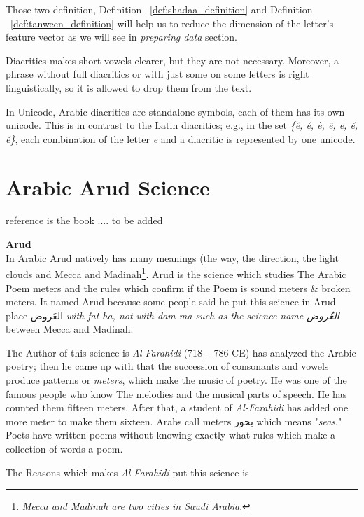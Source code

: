 Those two definition, Definition ~\ref{def:shadaa_definition} and Definition ~\ref{def:tanween_definition}  will help us to reduce the dimension of the letter's feature vector as we will see in \textit{preparing data} section.


Diacritics makes short vowels clearer, but they are not necessary.
Moreover, a phrase without full diacritics or with just some on some letters is
right linguistically, so it is allowed to drop them from the text.

In Unicode, Arabic diacritics are standalone symbols, each of them has its own
unicode. This is in contrast to the Latin diacritics; e.g., in the set
\textit{\{ê, é, è, ë, ē, ĕ, ě\}}, each combination of the letter \textit{e} and a diacritic is represented by one unicode.

\newpage

\section{Arabic Arud Science}
reference is the book .... to be added
\begin{definition}\label{def:arud}
  \textbf{Arud} \hfill \\
In Arabic Arud natively has many meanings (the way, the direction, the light clouds and Mecca and Madinah\footnote{\textit{Mecca and Madinah are two cities in  Saudi Arabia}.}. Arud is the science which studies The Arabic Poem meters and the rules which confirm if the Poem is sound meters \& broken meters. It named Arud because some people said he put this science in Arud place \textarabic{العَروض} \textit{with fat-ha, not with dam-ma such as the science name \textarabic{العُروض} } between Mecca and Madinah.
\end{definition}

The Author of this science is \textit{Al-Farahidi} (718 – 786 CE) has analyzed the
Arabic poetry; then he came up with that the succession of consonants and vowels
produce patterns or \textit{meters}, which make the music of poetry. He was one of the famous people who know The melodies and the musical parts of speech. He has
counted them fifteen meters.  After that, a student of \textit{Al-Farahidi} has
added one more meter to make them sixteen. Arabs call meters \textarabic{بحور}
which means "\textit{seas}." Poets have written poems without knowing exactly what rules which make a collection of words a poem.

The Reasons which makes \textit{Al-Farahidi} put this science is

